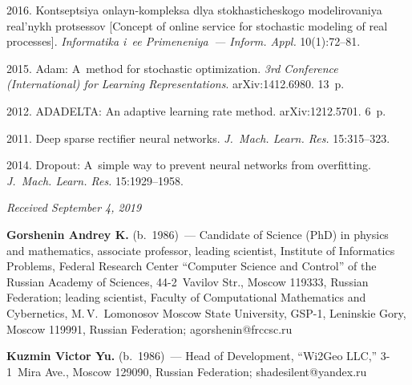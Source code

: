 \begin{multicols}{2}
{{\begin{thebibliography}{99}
 2016. Kontseptsiya onlayn-kompleksa dlya stokhasticheskogo 
modelirovaniya real'nykh pro\-tses\-sov [Concept of online service for stochastic modeling of real 
processes].  \textit{Informatika i~ee Primeneniya~--- Inform. Appl.} 10(1):72--81.

 2015. Adam: A~method for stochastic optimization. 
 \textit{3rd Conference (International) for Learning Representations}. 
 arXiv:1412.6980. 13~p.

 2012. ADADELTA: An adaptive learning rate method. 
arXiv:1212.5701. 6~p.

2011. Deep sparse rectifier neural networks.
 \textit{J.~Mach. Learn. Res.} 15:315--323.

 2014. Dropout: A~simple way to prevent neural networks from overfitting.
 \textit{J.~Mach. Learn. Res.} 15:1929--1958.
 
 \end{thebibliography}

 }
 }

\end{multicols}


\hfill{\small\textit{Received September 4, 2019}}




\Contr


\noindent
\textbf{Gorshenin Andrey K.} (b.\ 1986)~--- Candidate of Science (PhD) in physics and
mathematics, associate professor, leading scientist, Institute of Informatics Problems,
Federal Research Center ``Computer Science and Control'' of the Russian Academy of
Sciences, 44-2~Vavilov Str., Moscow 119333, Russian Federation;  
leading scientist, Faculty
of Computational Mathematics and Cybernetics, M.\,V.~Lomonosov Moscow State University, GSP-1,
Leninskie Gory, Moscow 119991, Russian Federation; \mbox{agorshenin@frccsc.ru}

\vspace*{3pt}

\noindent
\textbf{Kuzmin Victor Yu.} (b.\ 1986)~--- Head of Development, ``Wi2Geo LLC,'' 
3-1~Mira
Ave., Moscow 129090, Russian Federation; \mbox{shadesilent@yandex.ru}



\label{end\stat}

\renewcommand{\bibname}{\protect\rm Литература}  